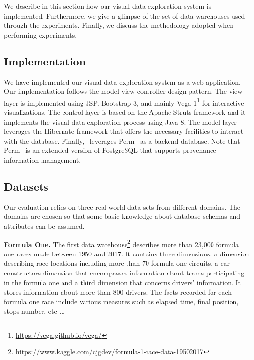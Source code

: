 \label{sec:setup}
We describe in this section how our visual data exploration system \prototype{} is implemented.
Furthermore, we give a glimpse of the set of data warehouses used through the experiments. 
Finally, we discuss the methodology adopted when performing experiments. 

\subsection{Implementation}
We have implemented our visual data exploration system \prototype{} as a web application. 
Our implementation follows the model-view-controller design pattern. 
The view layer is implemented using JSP, Bootstrap 3, and mainly Vega 1\footnote{\url{https://vega.github.io/vega/}} for interactive visualizations.
The control layer is based on the Apache Struts framework and it implements the visual data exploration process using Java 8.
The model layer leverages the Hibernate framework that offers the necessary facilities to interact with the database. Finally, \prototype\ leverages Perm~\cite{Glavic:09} as a backend database. Note that Perm~\cite{Glavic:09} is an extended version of PostgreSQL that supports provenance information management. 




\subsection{Datasets}
\label{evlin-ds}
Our evaluation relies on three real-world data sets from different domains.
The domains are chosen so that some basic knowledge about database schemas and attributes can be assumed.





\noindent \textbf{Formula One. } The first data warehouse\footnote{\url{https://www.kaggle.com/cjgdev/formula-1-race-data-19502017}} describes more than 23,000 formula one races made between 1950 and 2017. 
It contains three dimensions: a dimension describing race locations including more than 70 formula one circuits, a car constructors dimension that encompasses information about teams participating in the formula one and a third dimension that concerns drivers' information. It stores information about more than 800 drivers.
The facts recorded for each formula one race include various measures such as elapsed time, final position, stops number, etc $\ldots$

